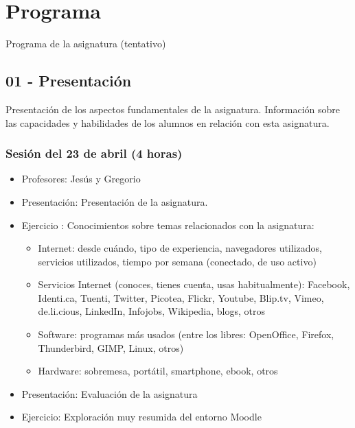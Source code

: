 \documentclass[a4paper,12pt]{article}
\begin{document}
\section{Programa}

Programa de la asignatura (tentativo)

\subsection{01 - Presentación}

Presentación de los aspectos fundamentales de la asignatura. Información sobre las capacidades y habilidades de los alumnos en relación con esta asignatura.

\subsubsection{Sesión del 23 de abril (4 horas)}

\begin{itemize}
\item Profesores: Jesús y Gregorio
\item Presentación: Presentación de la asignatura.
\item Ejercicio : Conocimientos sobre temas relacionados con la asignatura:
  \begin{itemize}
  \item Internet: desde cuándo, tipo de experiencia, navegadores utilizados, servicios utilizados, tiempo por semana (conectado, de uso activo)
  \item Servicios Internet (conoces, tienes cuenta, usas habitualmente): Facebook, Identi.ca, Tuenti, Twitter, Picotea, Flickr, Youtube, Blip.tv, Vimeo, de.li.cious, LinkedIn, Infojobs, Wikipedia, blogs, otros
  \item Software: programas más usados (entre los libres: OpenOffice, Firefox, Thunderbird, GIMP, Linux, otros)
  \item Hardware: sobremesa, portátil, smartphone, ebook, otros
  \end{itemize}
\item Presentación: Evaluación de la asignatura
\item Ejercicio: Exploración muy resumida del entorno Moodle
\end{itemize}
\end{document}
